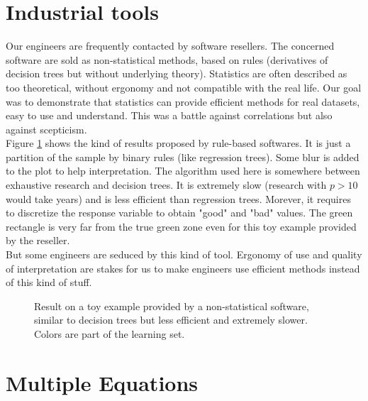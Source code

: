 \documentclass[12pt,a4paper]{report}
\begin{document}
		\section{Industrial tools}
			Our engineers are frequently contacted by software resellers. The concerned software are sold as non-statistical methods, based on rules (derivatives of decision trees but without underlying theory). Statistics are often described as too theoretical, without ergonomy and not compatible with the real life. Our goal was to demonstrate that statistics can provide efficient methods for real datasets, easy to use and understand.	This was a battle against correlations but also against scepticism. \\
			Figure \ref{Regle2D} shows the kind of results proposed by rule-based softwares. It is just a partition of the sample by binary rules (like regression trees). Some blur is added to the plot to help interpretation. The algorithm used here is somewhere between exhaustive research and decision trees. It is extremely slow (research with $p>10$ would take years) and is less efficient than regression trees. Morever, it requires to discretize the response variable to obtain "good" and "bad" values. The green rectangle is very far from the true green zone even for this toy example provided by the reseller.\\
			But some engineers are seduced by this kind of tool. Ergonomy of use and quality of interpretation are stakes for us to make engineers use efficient methods instead of this kind of stuff.
	
		\begin{figure}[h!]
	 \quad
	\caption{Result on a toy example provided by a non-statistical software, similar to decision trees but less efficient and extremely slower. Colors are part of the learning set.}\label{Regle2D}
\end{figure}	
			
	\section{Multiple Equations}		%
		
\end{document}
